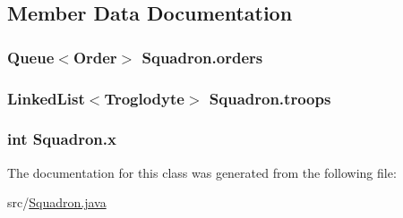 \subsection{Member Data Documentation}
\hypertarget{classSquadron_a30b28539300310fe7a2e26286f92d730}{
\subsubsection[{orders}]{\setlength{\rightskip}{0pt plus 5cm}Queue$<${\bf Order}$>$ Squadron.\-orders\hspace{0.3cm}{\ttfamily [private]}}}\label{classSquadron_a30b28539300310fe7a2e26286f92d730}
\hypertarget{classSquadron_a284a3d48159757fc677edb0ddd85d9e8}{
\subsubsection[{troops}]{\setlength{\rightskip}{0pt plus 5cm}Linked\-List$<${\bf Troglodyte}$>$ Squadron.\-troops\hspace{0.3cm}{\ttfamily [private]}}}\label{classSquadron_a284a3d48159757fc677edb0ddd85d9e8}
\hypertarget{classSquadron_aaaf7af69ca11387442fd075b61cdeee9}{
\subsubsection[{x}]{\setlength{\rightskip}{0pt plus 5cm}int Squadron.\-x\hspace{0.3cm}{\ttfamily [private]}}}\label{classSquadron_aaaf7af69ca11387442fd075b61cdeee9}


The documentation for this class was generated from the following file\-:\begin{DoxyCompactItemize}
\item 
src/\hyperlink{Squadron_8java}{Squadron.\-java}\end{DoxyCompactItemize}
